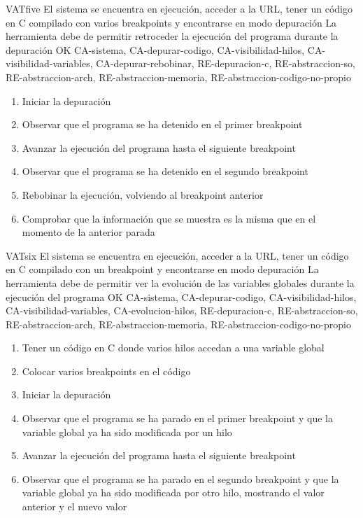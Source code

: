 \begin{testCase}{VAT}{five}
    {El sistema se encuentra en ejecución, acceder a la URL, tener un código en C compilado con varios breakpoints y encontrarse en modo depuración}
    {\NA}
    {La herramienta debe de permitir retroceder la ejecución del programa durante la depuración}
    {OK}
    {CA-sistema, CA-depurar-codigo, CA-visibilidad-hilos, CA-visibilidad-variables, CA-depurar-rebobinar, RE-depuracion-c, RE-abstraccion-so, RE-abstraccion-arch, RE-abstraccion-memoria, RE-abstraccion-codigo-no-propio}
    \begin{enumerate}
        \item Iniciar la depuración
        \item Observar que el programa se ha detenido en el primer breakpoint
        \item Avanzar la ejecución del programa hasta el siguiente breakpoint
        \item Observar que el programa se ha detenido en el segundo breakpoint
        \item Rebobinar la ejecución, volviendo al breakpoint anterior
        \item Comprobar que la información que se muestra es la misma que en el momento de la anterior parada
    \end{enumerate}
\end{testCase}

\begin{testCase}{VAT}{six}
    {El sistema se encuentra en ejecución, acceder a la URL, tener un código en C compilado con un breakpoint y encontrarse en modo depuración}
    {\NA}
    {La herramienta debe de permitir ver la evolución de las variables globales durante la ejecución del programa}
    {OK}
    {CA-sistema, CA-depurar-codigo, CA-visibilidad-hilos, CA-visibilidad-variables, CA-evolucion-hilos, RE-depuracion-c, RE-abstraccion-so, RE-abstraccion-arch, RE-abstraccion-memoria, RE-abstraccion-codigo-no-propio}
    \begin{enumerate}
        \item Tener un código en C donde varios hilos accedan a una variable global
        \item Colocar varios breakpoints en el código
        \item Iniciar la depuración
        \item Observar que el programa se ha parado en el primer breakpoint y que la variable global ya ha sido modificada por un hilo
        \item Avanzar la ejecución del programa hasta el siguiente breakpoint
        \item Observar que el programa se ha parado en el segundo breakpoint y que la variable global ya ha sido modificada por otro hilo, mostrando el valor anterior y el nuevo valor
    \end{enumerate}
\end{testCase}

